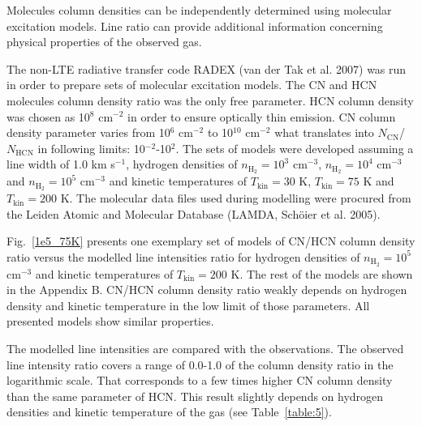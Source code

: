 \documentclass{aa}
\begin{document}
Molecules column densities can be independently determined using molecular excitation models. Line ratio can provide additional information concerning physical properties of the observed gas. 

The non-LTE radiative transfer code RADEX (van der Tak et al. 2007) was run in order to prepare sets of molecular excitation models. The CN and HCN molecules column density ratio was the only free parameter. HCN column density was chosen as 10$^8$ cm$^{-2}$ in order to ensure optically thin emission. CN column density parameter varies from 10$^6$ cm$^{-2}$ to 10$^{10}$ cm$^{-2}$ what translates into $N_\mathrm{CN}$/$N_\mathrm{HCN}$ in following limits: 10$^{-2}$-10$^{2}$. The sets of models were developed assuming a line width of 1.0 km s$^{-1}$, hydrogen densities of $n_\mathrm{H_2} = 10^3$ cm$^{-3}$, $n_\mathrm{H_2} = 10^4$ cm$^{-3}$ and $n_\mathrm{H_2} = 10^5$ cm$^{-3}$ and kinetic temperatures of $T_\mathrm{kin} = 30$ K, $T_\mathrm{kin} = 75$ K and $T_\mathrm{kin} =200$ K. The molecular data files used during modelling were procured from the Leiden Atomic and Molecular Database (LAMDA, Schöier et al. 2005).

Fig.~\ref{1e5_75K} presents one exemplary set of models of CN/HCN column density ratio versus the modelled line intensities ratio for hydrogen densities of $n_\mathrm{H_2} = 10^5$ cm$^{-3}$ and kinetic temperatures of $T_\mathrm{kin} = 200$ K. The rest of the models are shown in the Appendix B. CN/HCN column density ratio weakly depends on hydrogen density and kinetic temperature in the low limit of those parameters. All presented models show similar properties.

The modelled line intensities are compared with the observations. The observed line intensity ratio covers a range of \mbox{0.0-1.0} of the column density ratio in the logarithmic scale. That corresponds to a few times higher CN column density than the same parameter of HCN. This result slightly depends on hydrogen densities and kinetic temperature of the gas (see Table~\ref{table:5}).
\end{document}
